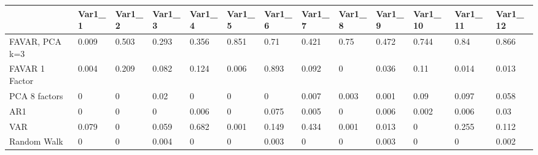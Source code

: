 \begin{tabular}{lllllllllllll}
\toprule 
& Var1_1 & Var1_2 & Var1_3 & Var1_4 & Var1_5 & Var1_6 & Var1_7 & Var1_8 & Var1_9 & Var1_10 & Var1_11 & Var1_12 \\ 
\midrule 
FAVAR, PCA k=3 & 0.009 & 0.503 & 0.293 & 0.356 & 0.851 & 0.71 & 0.421 & 0.75 & 0.472 & 0.744 & 0.84 & 0.866 \\ 
FAVAR 1 Factor & 0.004 & 0.209 & 0.082 & 0.124 & 0.006 & 0.893 & 0.092 & 0 & 0.036 & 0.11 & 0.014 & 0.013 \\ 
PCA 8 factors & 0 & 0 & 0.02 & 0 & 0 & 0 & 0.007 & 0.003 & 0.001 & 0.09 & 0.097 & 0.058 \\ 
AR1 & 0 & 0 & 0 & 0.006 & 0 & 0.075 & 0.005 & 0 & 0.006 & 0.002 & 0.006 & 0.03 \\ 
VAR & 0.079 & 0 & 0.059 & 0.682 & 0.001 & 0.149 & 0.434 & 0.001 & 0.013 & 0 & 0.255 & 0.112 \\ 
Random Walk & 0 & 0 & 0.004 & 0 & 0 & 0.003 & 0 & 0 & 0.003 & 0 & 0 & 0.002 \\ 
\bottomrule 
\end{tabular}